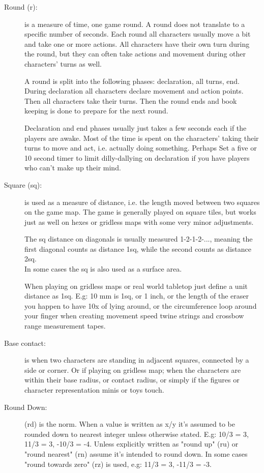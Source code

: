 \begin{description}
\item[Round (r):] is a measure of time, one game round. A round does not translate to a specific number of seconds. Each round all characters usually move a bit and take one or more actions. All characters have their own turn during the round, but they can often take actions and movement during other characters' turns as well.

A round is split into the following phases: declaration, all turns, end.
During declaration all characters declare movement and action points. Then all characters take their turns. Then the round ends and book keeping is done to prepare for the next round.

Declaration and end phases usually just takes a few seconds each if the players are awake. Most of the time is spent on the characters' taking their turns to move and act, i.e. actually doing something.
Perhaps Set a five or 10 second timer to limit dilly-dallying on declaration if you have players who can't make up their mind.


\item[Square (sq):] is used as a measure of distance, i.e. the length moved between two squares on the game map. The game is generally played on square tiles, but works just as well on hexes or gridless maps with some very minor adjustments.

The sq distance on diagonals is usually measured 1-2-1-2-..., meaning the first diagonal counts as distance 1sq, while the second counts as distance 2sq.\\
In some cases the sq is also used as a surface area.

When playing on gridless maps or real world tabletop just define a unit distance as 1sq. E.g: 10 mm is 1sq, or 1 inch, or the length of the eraser you happen to have 10x of lying around, or the circumference loop around your finger when creating movement speed twine strings and crossbow range measurement tapes.


\item[Base contact:] is when two characters are standing in adjacent squares, connected by a side or corner. Or if playing on gridless map; when the characters are within their base radius, or contact radius, or simply if the figures or character representation minis or toys touch.


\item[Round Down:] (rd) is the norm. When a value is written as x/y it's assumed to be rounded down to nearest integer unless otherwise stated. E.g: 10/3 = 3, 11/3 = 3, -10/3 = -4.
Unless explicitly written as "round up" (ru) or "round nearest" (rn) assume it's intended to round down. In some cases "round towards zero" (rz) is used, e.g: 11/3 = 3, -11/3 = -3.


\end{description}









